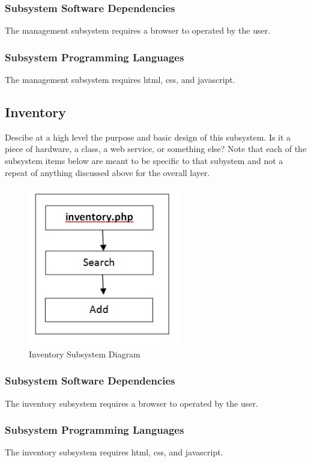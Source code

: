\subsubsection{Subsystem Software Dependencies}
The management subsystem requires a browser to operated by the user.

\subsubsection{Subsystem Programming Languages}
The management subsystem requires html, css, and javascript.




\subsection{Inventory}
Descibe at a high level the purpose and basic design of this subsystem. Is it a piece of hardware, a class, a web service, or something else? Note that each of the subsystem items below are meant to be specific to that subystem and not a repeat of anything discussed above for the overall layer.

\begin{figure}[h!]
	\centering
 	\includegraphics[width=0.60\textwidth]{images/inventory}
 \caption{Inventory Subsystem Diagram}
\end{figure}



\subsubsection{Subsystem Software Dependencies}
The inventory subsystem requires a browser to operated by the user.

\subsubsection{Subsystem Programming Languages}
The inventory subsystem requires html, css, and javascript.




